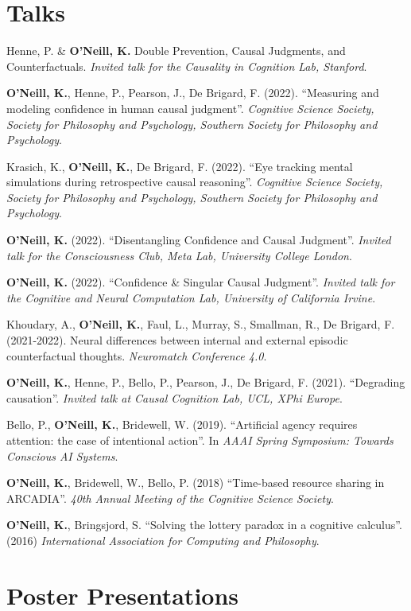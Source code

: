 \section{Talks}
Henne, P. \& \textbf{O'Neill, K.} Double Prevention, Causal Judgments,
and Counterfactuals. \emph{Invited talk for the Causality in Cognition
Lab, Stanford}.

\textbf{O'Neill, K.}, Henne, P., Pearson, J., De Brigard,
F. (2022). ``Measuring and modeling confidence in human causal
judgment''. \emph{Cognitive Science Society, Society for Philosophy
and Psychology, Southern Society for Philosophy and Psychology}.

Krasich, K., \textbf{O'Neill, K.}, De Brigard, F. (2022). ``Eye
tracking mental simulations during retrospective causal
reasoning''. \emph{Cognitive Science Society, Society for Philosophy
and Psychology, Southern Society for Philosophy and Psychology}.

\textbf{O'Neill, K.} (2022). ``Disentangling Confidence and Causal
Judgment''. \emph{Invited talk for the Consciousness Club, Meta Lab,
University College London}.

\textbf{O'Neill, K.} (2022). ``Confidence \& Singular Causal
Judgment''. \emph{Invited talk for the Cognitive and Neural
Computation Lab, University of California Irvine}.

Khoudary, A., \textbf{O’Neill, K.}, Faul, L., Murray, S., Smallman,
R., De Brigard, F. (2021-2022). Neural differences between internal
and external episodic counterfactual thoughts. \emph{Neuromatch
Conference 4.0}.

\textbf{O'Neill, K.}, Henne, P., Bello, P., Pearson, J., De Brigard,
F. (2021). ``Degrading causation''. \emph{Invited talk at Causal
Cognition Lab, UCL, XPhi Europe}.

Bello, P., \textbf{O'Neill, K.}, Bridewell, W. (2019). ``Artificial
agency requires attention: the case of intentional action''. In
\emph{AAAI Spring Symposium: Towards Conscious AI Systems}.

\textbf{O'Neill, K.}, Bridewell, W., Bello, P. (2018) ``Time-based
resource sharing in ARCADIA''. \emph{40th Annual Meeting of the
Cognitive Science Society}.

\textbf{O’Neill, K.}, Bringsjord, S. ``Solving the lottery paradox in
a cognitive calculus''. (2016) \emph{International Association for
Computing and Philosophy}.

\line\section{Poster Presentations}


